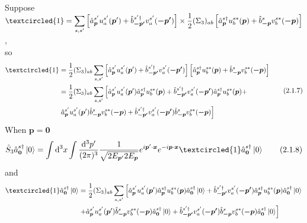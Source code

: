 \documentclass[12pt]{article}
\begin{document}
\begin{spacing}{1.5}
\begin{equation}
\begin{aligned}
\end{aligned}
	\tag{2.1.6}
\end{equation}
Suppose $\displaystyle \textcircled{1}=\sum\limits_{s,s'}\left[\hat a^{s'}_{\bm p}u^{s'}_{a}(\bm p')+\hat b^{s'\dagger}_{\bm{-p'}}v^{s'}_{a}(\bm{-p'})\right] \times \frac{1}{2}(\Sigma_{3})_{ab} \left[\hat a^{s\dagger}_{\bm p}u^{s*}_{b}(\bm p)+\hat b^{s}_{\bm{-p}}v^{s*}_{b}(\bm{-p})\right]$ ,\\
so
\begin{equation}
\begin{aligned}
\textcircled{1} &= \frac{1}{2}(\Sigma_{3})_{ab} \sum\limits_{s,s'}\left[\hat a^{s'}_{\bm p}u^{s'}_{a}(\bm p')+\hat b^{s'\dagger}_{\bm{-p'}}v^{s'}_{a}(\bm{-p'})\right]  \left[\hat a^{s\dagger}_{\bm p}u^{s*}_{b}(\bm p)+\hat b^{s}_{\bm{-p}}v^{s*}_{b}(\bm{-p})\right] \\
&= \frac{1}{2}(\Sigma_{3})_{ab} \sum\limits_{s,s'} \left[ { \hat a^{s'}_{\bm p}u^{s'}_{a}(\bm p')\hat a^{s\dagger}_{\bm p}u^{s*}_{b}(\bm p)+\hat b^{s'\dagger}_{\bm{-p'}}v^{s'}_{a}(\bm{-p'})\hat a^{s\dagger}_{\bm p}u^{s*}_{b}(\bm p)+ } \right. \\ & \left. { \hat a^{s'}_{\bm p}u^{s'}_{a}(\bm p')\hat b^{s}_{\bm{-p}}v^{s*}_{b}(\bm{-p})+\hat b^{s'\dagger}_{\bm{-p'}}v^{s'}_{a}(\bm{-p'})\hat b^{s}_{\bm{-p}}v^{s*}_{b}(\bm{-p}) } \right] \\
\end{aligned}
	\tag{2.1.7}
\end{equation}
When $\bm p=\bm0$
\begin{equation}
\hat S_{3} \hat a^{s\dagger}_{\bm0} \left|0\right> = \int\dif^{3}x\int \frac{\dif^{3} p'}{(2\pi)^{3}}\frac{1}{\sqrt{2E_{\bm p'}2E_{\bm p}}}e^{i\bm p' \cdot \bm x}e^{-i\bm p \cdot \bm x} \textcircled{1} \hat a^{s\dagger}_{\bm0} \left|0\right>
	\tag{2.1.8}
\end{equation}
and
\begin{equation}
\begin{aligned}
\textcircled{1}\hat a^{s\dagger}_{\bm0} \left|0\right> 
&= \frac{1}{2}(\Sigma_{3})_{ab} \sum\limits_{s,s'} \left[ { \hat a^{s'}_{\bm p}u^{s'}_{a}(\bm p')\hat a^{s\dagger}_{\bm p}u^{s*}_{b}(\bm p)\hat a^{s\dagger}_{\bm0} \left|0\right> +\hat b^{s'\dagger}_{\bm{-p'}}v^{s'}_{a}(\bm{-p'})\hat a^{s\dagger}_{\bm p}u^{s*}_{b}(\bm p)\hat a^{s\dagger}_{\bm0} \left|0\right> } \right. \\ & \left. { + \hat a^{s'}_{\bm p}u^{s'}_{a}(\bm p')\hat b^{s}_{\bm{-p}}v^{s*}_{b}(\bm{-p})\hat a^{s\dagger}_{\bm0} \left|0\right> +\hat b^{s'\dagger}_{\bm{-p'}}v^{s'}_{a}(\bm{-p'})\hat b^{s}_{\bm{-p}}v^{s*}_{b}(\bm{-p})\hat a^{s\dagger}_{\bm0} \left|0\right> } \right] \\

\end{aligned}
\end{equation}
\end{spacing}
\end{document}
